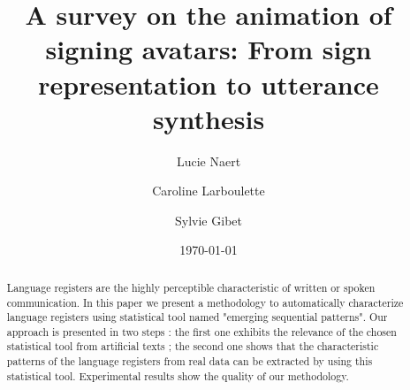 \documentclass[a4paper]{article}
\title{A survey on the animation of signing avatars: From sign representation to utterance synthesis}
\author{Lucie Naert \and Caroline Larboulette \and Sylvie Gibet}
\date{\today}
\begin{document}
\maketitle

\begin{abstract}
  Language registers are the highly perceptible characteristic of written or spoken communication. In this paper we present a methodology to automatically characterize language registers using statistical tool named "emerging sequential patterns". Our approach is presented in two steps : the first one exhibits the relevance of the chosen statistical tool from artificial texts ; the second one shows that the characteristic patterns of the language registers from real data can be extracted by using this statistical tool. Experimental results show the quality of our methodology. 
\end{abstract}
\end{document}
